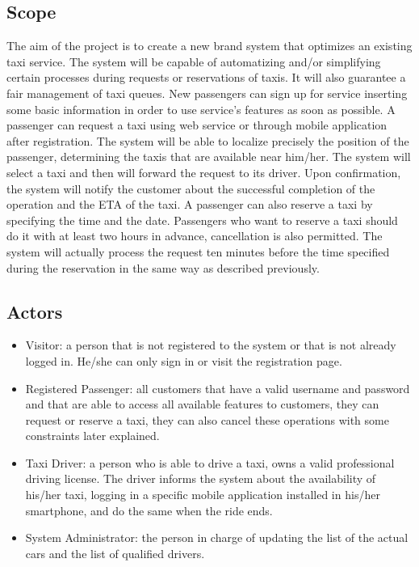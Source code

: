 \documentclass[a4paper,12pt]{article}%
\begin{document}
\subsection{Scope}
The aim of the project is to create a new brand system that optimizes an 
existing taxi service.
The system will be capable of automatizing  and/or simplifying certain 
processes during requests or reservations of taxis.
It will also guarantee a fair management of taxi queues.
New passengers can sign up for service inserting some basic information in order to use service's features as soon as possible.
A passenger can request a taxi using web service or through mobile
application after registration. The system will be able to localize precisely the position
of the passenger, determining the taxis that are available near
him/her. The system will select a taxi and then will forward the request to its driver.
Upon confirmation, the system will notify the customer about the successful completion of the operation and the ETA of the taxi. A passenger can also reserve a taxi by specifying the time and the date.
Passengers who want to reserve a taxi should do it with at least two hours in advance, cancellation is also permitted. The system will actually process the request ten minutes before the time specified during the reservation in the same way as described previously.

\subsection{Actors}
\begin{itemize}
\item Visitor: a person that is not registered to the system or that is not already logged in. He/she can only sign in or visit the registration page.
\item Registered Passenger: all customers that have a valid username and password and that are able to access all available features to customers, they can request or reserve a taxi, they can also cancel these operations with some constraints later explained.
\item Taxi Driver: a person who is able to drive a taxi, owns a valid 
professional driving license. The driver informs the system about the availability of his/her taxi, logging in a specific mobile application installed in his/her smartphone, and do the same when the ride ends. 
\item System Administrator: the person in charge of updating the list of the actual cars and the list of qualified drivers.
\end{itemize}
\end{document}
